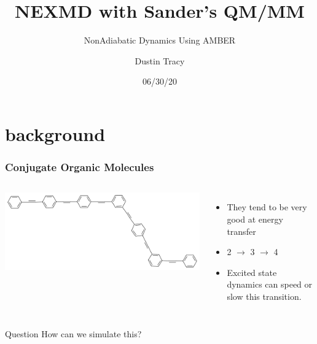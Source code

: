 \documentclass{beamer}
\title{NEXMD with Sander's QM/MM}
\subtitle{NonAdiabatic Dynamics Using AMBER}
\author{Dustin Tracy}
\institute{University of Florida}
\date{06/30/20}
\begin{document}
\begin{frame}
  \titlepage
\end{frame}

\section{background}
\begin{frame}
  \frametitle{Conjugate Organic Molecules}
\begin{columns}[c]
  \includegraphics[width=\textwidth]{Images/com}
  \begin{itemize}
    \item They tend to be very good at energy transfer
    \item 2 $\rightarrow$ 3 $\rightarrow$ 4
    \item Excited state dynamics can speed or slow this transition.
  \end{itemize}
\end{columns}
\begin{block}{Question}
  How can we simulate this?
\end{block}
\end{frame}
\end{document}
